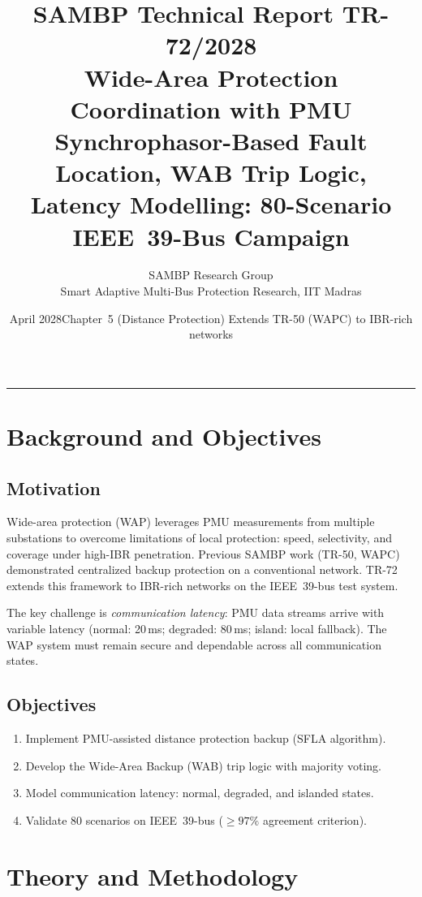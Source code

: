 \documentclass[11pt, a4paper]{article}
\title{\textbf{\textsf{\color{sambpblue}SAMBP Technical Report TR-72/2028}}\\[6pt]
  \Large Wide-Area Protection Coordination with PMU\\[4pt]
  \normalsize Synchrophasor-Based Fault Location, WAB Trip Logic,
  Latency Modelling: 80-Scenario IEEE~39-Bus Campaign}
\author{SAMBP Research Group\\[2pt]
  \small Smart Adaptive Multi-Bus Protection Research, IIT Madras}
\date{April 2028\quad\textbar\quad Chapter~5 (Distance Protection)\quad\textbar\quad
  Extends TR-50 (WAPC) to IBR-rich networks}
\begin{document}
\maketitle
\tableofcontents
\vspace{6pt}\hrule\vspace{10pt}

\section{Background and Objectives}
\label{sec:background}

\subsection{Motivation}

Wide-area protection (WAP) leverages PMU measurements from multiple substations
to overcome limitations of local protection: speed, selectivity, and coverage
under high-IBR penetration. Previous SAMBP work (TR-50, WAPC) demonstrated
centralized backup protection on a conventional network. TR-72 extends this
framework to IBR-rich networks on the IEEE~39-bus test system.

The key challenge is \emph{communication latency}: PMU data streams arrive
with variable latency (normal: 20\,ms; degraded: 80\,ms; island: local
fallback). The WAP system must remain secure and dependable across all
communication states.

\subsection{Objectives}

\begin{enumerate}
  \item Implement PMU-assisted distance protection backup (SFLA algorithm).
  \item Develop the Wide-Area Backup (WAB) trip logic with majority voting.
  \item Model communication latency: normal, degraded, and islanded states.
  \item Validate 80 scenarios on IEEE~39-bus ($\geq 97\%$ agreement criterion).
\end{enumerate}

\section{Theory and Methodology}
\label{sec:theory}
\end{document}
